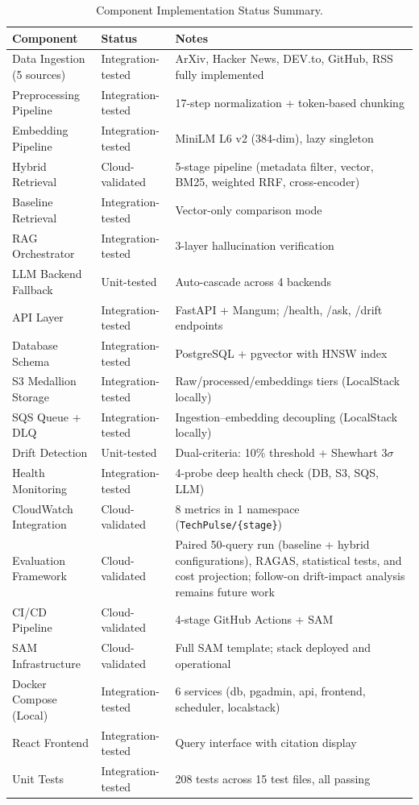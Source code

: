 \begin{table}[htbp]
\caption{Component Implementation Status Summary.}
\label{tab:impl_status}
\centering
\begin{tabular}{p{4.2cm}p{2.8cm}p{5.5cm}}
\toprule
\textbf{Component} & \textbf{Status} & \textbf{Notes} \\
\midrule
Data Ingestion (5 sources) & Integration-tested & ArXiv, Hacker News, DEV.to, GitHub, RSS fully implemented \\
Preprocessing Pipeline & Integration-tested & 17-step normalization + token-based chunking \\
Embedding Pipeline & Integration-tested & MiniLM L6 v2 (384-dim), lazy singleton \\
Hybrid Retrieval & Cloud-validated & 5-stage pipeline (metadata filter, vector, BM25, weighted RRF, cross-encoder) \\
Baseline Retrieval & Integration-tested & Vector-only comparison mode \\
RAG Orchestrator & Integration-tested & 3-layer hallucination verification \\
LLM Backend Fallback & Unit-tested & Auto-cascade across 4 backends \\
API Layer & Integration-tested & FastAPI + Mangum; /health, /ask, /drift endpoints \\
Database Schema & Integration-tested & PostgreSQL + pgvector with HNSW index \\
S3 Medallion Storage & Integration-tested & Raw/processed/embeddings tiers (LocalStack locally) \\
SQS Queue + DLQ & Integration-tested & Ingestion--embedding decoupling (LocalStack locally) \\
Drift Detection & Unit-tested & Dual-criteria: 10\% threshold + Shewhart $3\sigma$ \\
Health Monitoring & Integration-tested & 4-probe deep health check (DB, S3, SQS, LLM) \\
CloudWatch Integration & Cloud-validated & 8 metrics in 1 namespace (\texttt{TechPulse/\{stage\}}) \\
Evaluation Framework & Cloud-validated & Paired 50-query run (baseline + hybrid configurations), RAGAS, statistical tests, and cost projection; follow-on drift-impact analysis remains future work \\
CI/CD Pipeline & Cloud-validated & 4-stage GitHub Actions + SAM \\
SAM Infrastructure & Cloud-validated & Full SAM template; stack deployed and operational \\
Docker Compose (Local) & Integration-tested & 6 services (db, pgadmin, api, frontend, scheduler, localstack) \\
React Frontend & Integration-tested & Query interface with citation display \\
Unit Tests & Integration-tested & 208 tests across 15 test files, all passing \\
\bottomrule
\end{tabular}
\end{table}

